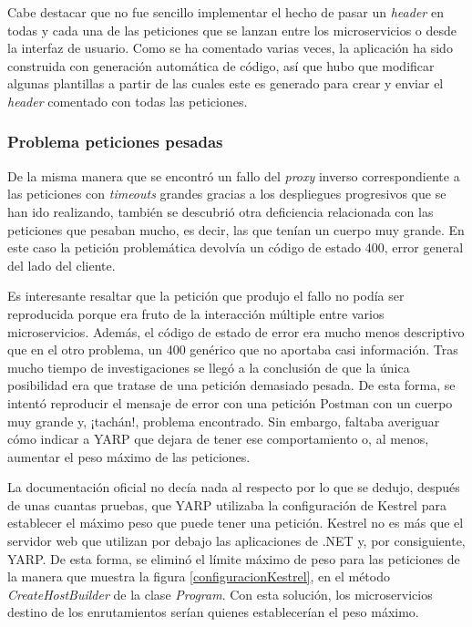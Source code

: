 \documentclass[11pt,spanish,listoffigures]{tfgetsinf}
\begin{document}
Cabe destacar que no fue sencillo implementar el hecho de pasar un \emph{header} en todas y cada una de las peticiones que se lanzan entre los microservicios o desde la interfaz de usuario. Como se ha comentado varias veces, la aplicación ha sido construida con generación automática de código, así que hubo que modificar algunas plantillas a partir de las cuales este es generado para crear y enviar el \emph{header} comentado con todas las peticiones.


			\subsubsection{Problema peticiones pesadas}

De la misma manera que se encontró un fallo del \emph{proxy} inverso correspondiente a las peticiones con \emph{timeouts} grandes gracias a los despliegues progresivos que se han ido realizando, también se descubrió otra deficiencia relacionada con las peticiones que pesaban mucho, es decir, las que tenían un cuerpo muy grande. En este caso la petición problemática devolvía un código de estado 400, error general del lado del cliente.

Es interesante resaltar que la petición que produjo el fallo no podía ser reproducida porque era fruto de la interacción múltiple entre varios microservicios. Además, el código de estado de error era mucho menos descriptivo que en el otro problema, un 400 genérico que no aportaba casi información. Tras mucho tiempo de investigaciones se llegó a la conclusión de que la única posibilidad era que tratase de una petición demasiado pesada. De esta forma, se intentó reproducir el mensaje de error con una petición Postman con un cuerpo muy grande y, ¡tachán!, problema encontrado. Sin embargo, faltaba averiguar cómo indicar a YARP que dejara de tener ese comportamiento o, al menos, aumentar el peso máximo de las peticiones.

La documentación oficial no decía nada al respecto por lo que se dedujo, después de unas cuantas pruebas, que YARP utilizaba la configuración de Kestrel \cite{Kestrel} para establecer el máximo peso que puede tener una petición. Kestrel no es más que el servidor web que utilizan por debajo las aplicaciones de .NET y, por consiguiente, YARP. De esta forma, se eliminó el límite máximo de peso para las peticiones de la manera que muestra la figura \ref{configuracionKestrel}, en el método \emph{CreateHostBuilder} de la clase \emph{Program}. Con esta solución, los microservicios destino de los enrutamientos serían quienes establecerían el peso máximo.
\end{document}
